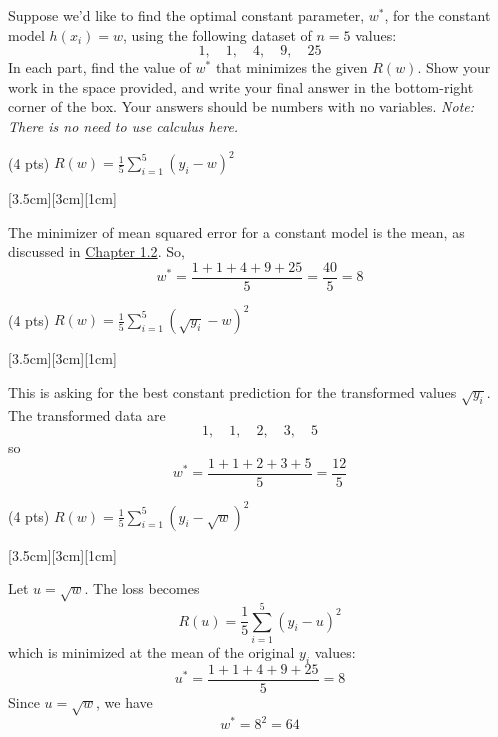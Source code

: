 \documentclass[11pt]{article}
\begin{document}
\begin{prob}
Suppose we'd like to find the optimal constant parameter, $w^*$, for the constant model $h(x_i)=w$, using the following dataset of $n=5$ values:
\[
1,\quad 1,\quad 4,\quad 9,\quad 25
\]
In each part, find the value of $w^*$ that minimizes the given $R(w)$. Show your work in the space provided, and write your final answer in the bottom-right corner of the box. Your answers should be numbers with no variables. \textit{Note: There is no need to use calculus here.}

\begin{subprob}(4 pts) $\displaystyle R(w) = \frac{1}{5} \sum_{i=1}^5 (y_i - w)^2$

[3.5cm][3cm][1cm]

\begin{solution}
The minimizer of mean squared error for a constant model is the mean, as discussed in \href{https://notes.eecs245.org/introduction-to-supervised-learning/squared-loss-constant-model/}{Chapter 1.2}. So,
\[
w^* = \frac{1+1+4+9+25}{5} = \frac{40}{5} = 8
\]
\end{solution}
\end{subprob}

\begin{subprob}(4 pts) $\displaystyle R(w) = \frac{1}{5} \sum_{i=1}^5 (\sqrt{y_i} - w)^2$

[3.5cm][3cm][1cm]

\begin{solution}
This is asking for the best constant prediction for the transformed values $\sqrt{y_i}$. The transformed data are
\[
1,\quad 1,\quad 2,\quad 3,\quad 5
\]
so
\[
w^* = \frac{1+1+2+3+5}{5} = \frac{12}{5}
\]
\end{solution}
\end{subprob}

\begin{subprob}(4 pts) $\displaystyle R(w) = \frac{1}{5} \sum_{i=1}^5 (y_i - \sqrt{w})^2$

[3.5cm][3cm][1cm]

\begin{solution}
Let $u=\sqrt{w}$. The loss becomes
\[
R(u) = \frac{1}{5}\sum_{i=1}^5 (y_i-u)^2
\]
which is minimized at the mean of the original $y_i$ values:
\[
u^* = \frac{1+1+4+9+25}{5} = 8
\]
Since $u=\sqrt{w}$, we have
\[
w^* = 8^2 = 64
\]
\end{solution}
\end{subprob}


\end{prob}
\end{document}

